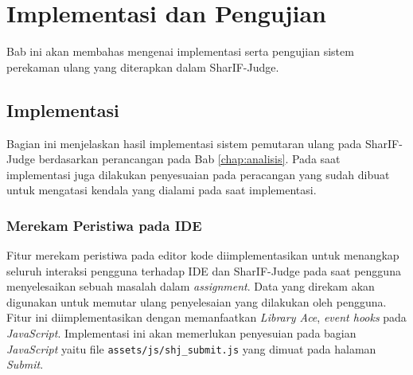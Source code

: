 \chapter{Implementasi dan Pengujian}
\label{chap:implementasidanpengujian}

Bab ini akan membahas mengenai implementasi serta pengujian sistem perekaman ulang yang diterapkan dalam SharIF-Judge.

\section{Implementasi}
\label{sec:5:implementasi}

Bagian ini menjelaskan hasil implementasi sistem pemutaran ulang pada SharIF-Judge berdasarkan perancangan pada Bab \ref{chap:analisis}. Pada saat implementasi juga dilakukan penyesuaian pada peracangan yang sudah dibuat untuk mengatasi kendala yang dialami pada saat implementasi. 

\subsection{Merekam Peristiwa pada IDE}
\label{sub:5:2:merekam}

Fitur merekam peristiwa pada editor kode diimplementasikan untuk menangkap seluruh interaksi pengguna terhadap IDE dan SharIF-Judge pada saat pengguna menyelesaikan sebuah masalah dalam \textit{assignment}. Data yang direkam akan digunakan untuk memutar ulang penyelesaian yang dilakukan oleh pengguna. Fitur ini diimplementasikan dengan memanfaatkan \textit{Library Ace}, \textit{event hooks} pada \textit{JavaScript}. Implementasi ini akan memerlukan penyesuian pada bagian \textit{JavaScript} yaitu file \verb|assets/js/shj_submit.js| yang dimuat pada halaman \textit{Submit}.

